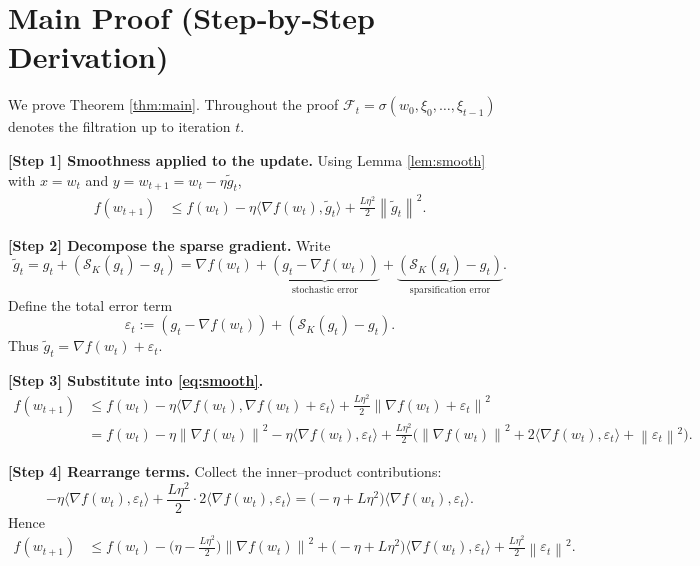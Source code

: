 \documentclass{article}
\newcommand{\norm}[1]{\left\|#1\right\|}
\newcommand{\topK}[2]{\mathcal{S}_{#1}(#2)}   %
\begin{document}
\section*{Main Proof (Step‑by‑Step Derivation)}
We prove Theorem \ref{thm:main}. Throughout the proof $ \mathcal{F}_{t}= \sigma(w_{0},\xi_{0},\dots ,\xi_{t-1})$ denotes the filtration up to iteration $t$.

\bigskip
\noindent\textbf{[Step 1] Smoothness applied to the update.}
Using Lemma \ref{lem:smooth} with $x=w_{t}$ and $y=w_{t+1}=w_{t}-\eta\tilde g_{t}$,
\begin{align}
f(w_{t+1}) &\le f(w_{t})-\eta\langle\nabla f(w_{t}),\tilde g_{t}\rangle
+\frac{L\eta^{2}}{2}\norm{\tilde g_{t}}^{2}. \label{eq:smooth}
\end{align}

\noindent\textbf{[Step 2] Decompose the sparse gradient.}
Write
\[
\tilde g_{t}=g_{t}+(\topK{K}{g_{t}}-g_{t})
= \nabla f(w_{t}) + \underbrace{(g_{t}-\nabla f(w_{t}))}_{\text{stochastic error}}
+ \underbrace{(\topK{K}{g_{t}}-g_{t})}_{\text{sparsification error}} .
\]
Define the total error term
\[
\varepsilon_{t}:=(g_{t}-\nabla f(w_{t})) + (\topK{K}{g_{t}}-g_{t}).
\]
Thus $\tilde g_{t}= \nabla f(w_{t})+\varepsilon_{t}$.

\noindent\textbf{[Step 3] Substitute into \eqref{eq:smooth}.}
\begin{align}
f(w_{t+1}) &\le f(w_{t})-\eta\langle\nabla f(w_{t}),\nabla f(w_{t})+\varepsilon_{t}\rangle
+\frac{L\eta^{2}}{2}\norm{\nabla f(w_{t})+\varepsilon_{t}}^{2}\nonumber\\
&= f(w_{t})-\eta\norm{\nabla f(w_{t})}^{2}
-\eta\langle\nabla f(w_{t}),\varepsilon_{t}\rangle
+\frac{L\eta^{2}}{2}\bigl(\norm{\nabla f(w_{t})}^{2}+2\langle\nabla f(w_{t}),\varepsilon_{t}\rangle
+\norm{\varepsilon_{t}}^{2}\bigr). \label{eq:expand}
\end{align}

\noindent\textbf{[Step 4] Rearrange terms.}
Collect the inner–product contributions:
\[
-\eta\langle\nabla f(w_{t}),\varepsilon_{t}\rangle
+\frac{L\eta^{2}}{2}\cdot 2\langle\nabla f(w_{t}),\varepsilon_{t}\rangle
=
\bigl(-\eta+L\eta^{2}\bigr)\langle\nabla f(w_{t}),\varepsilon_{t}\rangle .
\]
Hence
\begin{align}
f(w_{t+1}) &\le f(w_{t})
-\bigl(\eta-\tfrac{L\eta^{2}}{2}\bigr)\norm{\nabla f(w_{t})}^{2}
+\bigl(-\eta+L\eta^{2}\bigr)\langle\nabla f(w_{t}),\varepsilon_{t}\rangle
+\frac{L\eta^{2}}{2}\norm{\varepsilon_{t}}^{2}. \label{eq:rearr}
\end{align}
\end{document}
